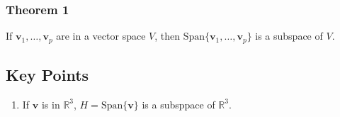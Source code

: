 \documentclass{article}
\begin{document}
\subsubsection*{Theorem 1}
If $\mathbf{v}_1,\ldots, \mathbf{v}_p$ are in a vector space $V$, then $\text{Span}\{\mathbf{v}_1,\ldots, \mathbf{v}_p\}$ is a subspace of $V$.

\subsection*{Key Points}
\begin{enumerate}
    \item If $\mathbf{v}$ is in $\mathbb{R}^3$, $H=\text{Span}\{\mathbf{v}\}$ is a subsppace of $\mathbb{R}^3$.
\end{enumerate}
\end{document}
